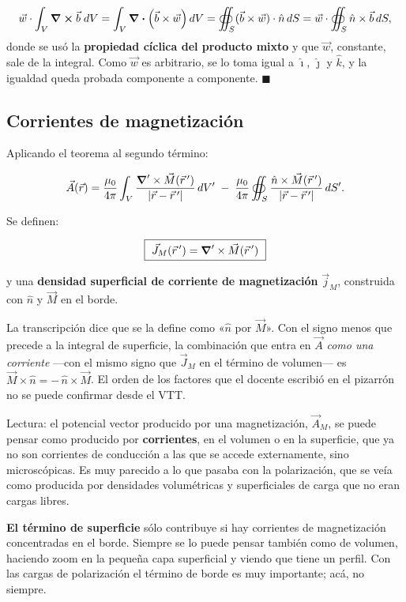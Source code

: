 \documentclass[12pt,a4paper]{article}
\begin{document}
\[
\vec w\cdot\int_V \curl \vec b\;dV
= \int_V \div (\vec b\times\vec w)\,dV
= \oiint_S (\vec b\times\vec w)\cdot\hat n\,dS
= \vec w\cdot\oiint_S \hat n\times\vec b\,dS,
\]
donde se usó la \textbf{propiedad cíclica del producto mixto} y que $\vec w$,
constante, sale de la integral. Como $\vec w$ es arbitrario, se lo toma igual a
$\hat\imath$, $\hat\jmath$ y $\hat k$, y la igualdad queda probada componente a
componente. $\blacksquare$

\subsection{Corrientes de magnetización}

Aplicando el teorema al segundo término:

\[
\vec A(\vec r) = \frac{\mu_0}{4\pi}\int_V
\frac{\vnabla'\times\vec M(\vec r\,')}{|\vec r-\vec r\,'|}\,dV'
\;-\; \frac{\mu_0}{4\pi}\oiint_S
\frac{\hat n\times\vec M(\vec r\,')}{|\vec r-\vec r\,'|}\,dS' .
\]

Se definen:

\begin{keybox}
\[
\boxed{\ \vec J_M(\vec r\,') = \vnabla'\times\vec M(\vec r\,')\ }
\]
\end{keybox}
y una \textbf{densidad superficial de corriente de magnetización} $\vec j_M$,
construida con $\hat n$ y $\vec M$ en el borde.

\begin{warnbox}
La transcripción dice que se la define como
«$\hat n$ por $\vec M$». Con el signo menos que precede a la integral de
superficie, la combinación que entra en $\vec A$ \emph{como una corriente} ---con el
mismo signo que $\vec J_M$ en el término de volumen--- es
$\vec M\times\hat n = -\,\hat n\times\vec M$. El orden de los factores que el
docente escribió en el pizarrón no se puede confirmar desde el VTT.
\end{warnbox}

Lectura: el potencial vector producido por una magnetización,
$\vec A_M$, se puede pensar como producido por \textbf{corrientes}, en el volumen o
en la superficie, que ya no son corrientes de conducción a las que se accede
externamente, sino microscópicas. Es muy parecido a lo que pasaba con la
polarización, que se veía como producida por densidades volumétricas y
superficiales de carga que no eran cargas libres.

\begin{notebox}
\textbf{El término de superficie} sólo contribuye si hay corrientes de
magnetización concentradas en el borde. Siempre se lo puede pensar también
como de volumen, haciendo zoom en la pequeña capa superficial y viendo que
tiene un perfil. Con las cargas de polarización el término de borde es muy
importante; acá, no siempre.
\end{notebox}
\end{document}
